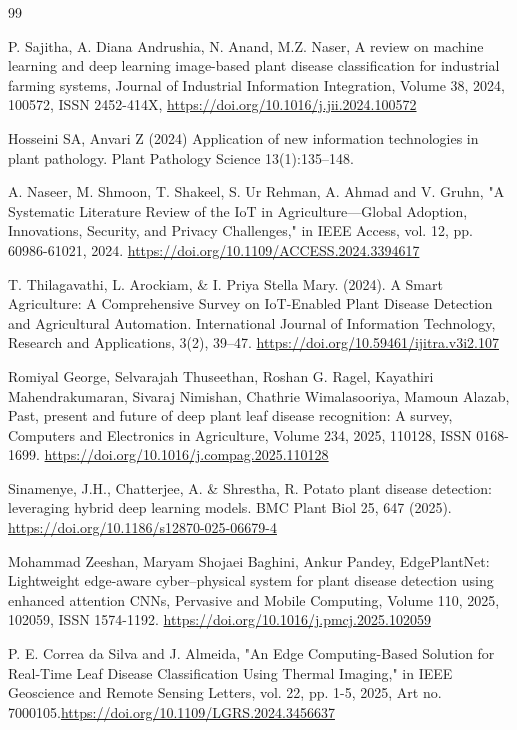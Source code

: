 \documentclass[pdflatex,sn-mathphys-num,iicol]{sn-jnl} %
\theoremstyle{thmstyleone}
\theoremstyle{thmstyletwo}
\theoremstyle{thmstylethree}
\begin{document}
\begin{thebibliography}{99}

 P. Sajitha, A. Diana Andrushia, N. Anand, M.Z. Naser,
A review on machine learning and deep learning image-based plant disease classification for industrial farming systems,
Journal of Industrial Information Integration,
Volume 38,
2024,
100572,
ISSN 2452-414X,
\url{https://doi.org/10.1016/j.jii.2024.100572}


 Hosseini SA, Anvari Z (2024) Application of new information technologies in plant pathology. Plant Pathology Science 13(1):135–148. 


 A. Naseer, M. Shmoon, T. Shakeel, S. Ur Rehman, A. Ahmad and V. Gruhn, "A Systematic Literature Review of the IoT in Agriculture—Global Adoption, Innovations, Security, and Privacy Challenges," in IEEE Access, vol. 12, pp. 60986-61021, 2024.
\url{https://doi.org/10.1109/ACCESS.2024.3394617}

 T. Thilagavathi, L. Arockiam, & I. Priya Stella Mary. (2024). A Smart Agriculture: A Comprehensive Survey on IoT-Enabled Plant Disease Detection and Agricultural Automation. International Journal of Information Technology, Research and Applications, 3(2), 39–47. \url{https://doi.org/10.59461/ijitra.v3i2.107}


Romiyal George, Selvarajah Thuseethan, Roshan G. Ragel, Kayathiri Mahendrakumaran, Sivaraj Nimishan, Chathrie Wimalasooriya, Mamoun Alazab,
Past, present and future of deep plant leaf disease recognition: A survey,
Computers and Electronics in Agriculture,
Volume 234,
2025,
110128,
ISSN 0168-1699. \url{https://doi.org/10.1016/j.compag.2025.110128}

 Sinamenye, J.H., Chatterjee, A. & Shrestha, R. Potato plant disease detection: leveraging hybrid deep learning models. BMC Plant Biol 25, 647 (2025). \url{https://doi.org/10.1186/s12870-025-06679-4}

 Mohammad Zeeshan, Maryam Shojaei Baghini, Ankur Pandey,
EdgePlantNet: Lightweight edge-aware cyber–physical system for plant disease detection using enhanced attention CNNs,
Pervasive and Mobile Computing,
Volume 110,
2025,
102059,
ISSN 1574-1192. \url{https://doi.org/10.1016/j.pmcj.2025.102059}


 P. E. Correa da Silva and J. Almeida, "An Edge Computing-Based Solution for Real-Time Leaf Disease Classification Using Thermal Imaging," in IEEE Geoscience and Remote Sensing Letters, vol. 22, pp. 1-5, 2025, Art no. 7000105.\url{https://doi.org/10.1109/LGRS.2024.3456637}




\end{thebibliography}
\end{document}
